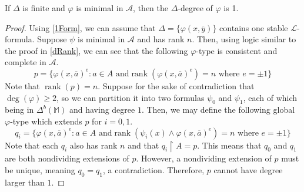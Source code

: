 \documentclass{article}
\newcommand\monster{\mathbb{M}}
\DeclareMathOperator{\rank}{rank}
\let\mc\mathcal
\begin{document}
\begin{lemma}
    If $\Delta$ is finite and $\varphi$ is minimal in $\mc{A}$, then the $\Delta$-degree of $\varphi$ is 1.
\end{lemma}
\begin{proof}
    Using \autoref{1Form}, we can assume that $\Delta = \{ \varphi(x, \overline{y}) \}$ contains one stable $\mc{L}$-formula. Suppose $\psi$ is minimal in $\mc{A}$ and has rank $n$. Then, using logic similar to the proof in \autoref{dRank}, we can see that the following $\varphi$-type is consistent and complete in $\mc{A}$.
    \[ p = \{ {\varphi(x, \overline{a})}^{e} : a \in A \text{ and} \rank( {\varphi(x, \overline{a})}^{e} ) = n \text{ where } e = \pm 1 \} \]
    Note that $\rank(p) = n$. Suppose for the sake of contradiction that $\deg(\varphi) \geq 2$, so we can partition it into two formulas $\psi_0$ and $\psi_1$, each of which being in $\Delta^b(\monster)$ and having degree $1$. Then, we may define the following global $\varphi$-type which extends $p$ for $i = 0,1$.
    \[ q_i = \{ {\varphi(x, \overline{a})}^{e} : a \in A \text{ and} \rank( {\psi_i(x) \land \varphi(x, \overline{a})}^{e} ) = n \text{ where } e = \pm 1 \} \]
    Note that each $q_i$ also has rank $n$ and that $q_i \restriction A = p$. This means that $q_0$ and $q_1$ are both nondividing extensions of $p$. However, a nondividing extension of $p$ must be unique, meaning $q_0 = q_1$, a contradiction. Therefore, $p$ cannot have degree larger than $1$.
\end{proof}
\end{document}

